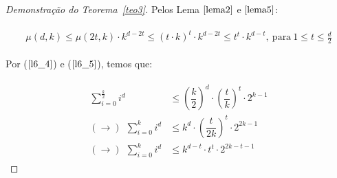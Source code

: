 \begin{proof}[Demonstração do Teorema~\ref{teo3}]
	Pelos Lema $\ref{lema2}$ e $\ref{lema5}$:
	
	\begin{align}
		\begin{split} 
			\label{l6_5} 
			\mu(d, k) \leq \mu(2t, k) {\cdot} k^{d - 2t}  \leq  (t {\cdot} k)^{t} {\cdot} k^{d - 2t} \leq t^t {\cdot} k^{d-t}, \ \text{para} \ 1 \leq t \leq \frac{d}{2}
		\end{split} 
	\end{align}
	
	Por ($\ref{l6_4}$) e ($\ref{l6_5}$), temos que:
	
	\begin{align}
		\begin{split} 
			\sum\limits_{i = 0}^{  \frac{k}{2}   }i^{d} &\leq \left(\dfrac{k}{2} \right)^{d} {\cdot} \left(\dfrac{t}{k} \right)^t  {\cdot} 2^{k-1}  \\
			(\rightarrow) \ \ \sum\limits_{i = 0}^{ k }i^{d} &\leq  k^{d} {\cdot} \left(\dfrac{t}{2k} \right)^t  {\cdot} 2^{2k-1}    \\ 
			(\rightarrow) \ \ \sum\limits_{i = 0}^{ k }i^{d}  &\leq k^{d-t} {\cdot} t^t  {\cdot} 2^{2k-t-1} 
		\end{split} 
	\end{align}
	
\end{proof}